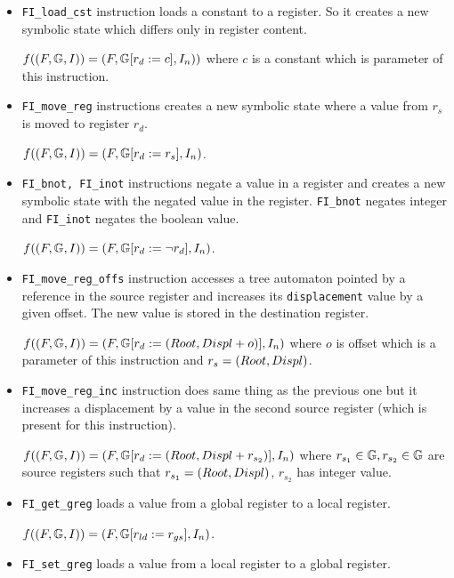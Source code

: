 \begin{itemize}

	\item {\tt FI\_load\_cst} instruction loads a constant to a register.
		So it creates a new symbolic state which differs only in register content.
		
		$f((F, \mathbb{G}, I)) = (F, \mathbb{G} [r_d := c], I_n))$ where
		$c$ is a constant which is parameter of this instruction.
	
	\item {\tt FI\_move\_reg} instructions creates a new symbolic state where
		a value from $r_s$ is moved to register $r_d$.
		
		$f((F, \mathbb{G}, I)) = (F, \mathbb{G} [r_d := r_s], I_n)$.
	
	\item {\tt FI\_bnot, FI\_inot} instructions negate a value in a register and
		creates a new symbolic state with the negated value in the register.
		{\tt FI\_bnot} negates integer and {\tt FI\_inot} negates the boolean value.
		
		$f((F, \mathbb{G}, I)) = (F, \mathbb{G} [r_d := \neg r_d], I_n)$.
	
	\item {\tt FI\_move\_reg\_offs} instruction accesses a tree automaton pointed
		by a reference in the source register and increases its {\tt displacement} value by a given offset.
		The new value is stored in the destination register.
		
		$f((F, \mathbb{G}, I)) = (F, \mathbb{G} [r_d := (Root,Displ+o)], I_n)$
		where $o$ is offset which is a parameter of this instruction
		and $r_s=(Root,Displ)$.
	
	\item {\tt FI\_move\_reg\_inc} instruction does same thing as the previous one but
		it increases a displacement by a value in the second source register (which is
		present for this instruction).
		
		$f((F, \mathbb{G}, I)) = (F, \mathbb{G} [r_d := (Root,Displ + r_{s_2})], I_n)$
		where $r_{s_1} \in \mathbb{G}, r_{s_2} \in \mathbb{G}$ are source registers such that
		$r_{s_1}=(Root,Displ)$, $r_{s_2}$ has integer value.
	
	\item {\tt FI\_get\_greg} loads a value from a global register to
		a local register.
		
		$f((F, \mathbb{G}, I)) = (F, \mathbb{G} [r_{ld} := r_{gs}], I_n)$.
	
	\item {\tt FI\_set\_greg} loads a value from a local register to
		a global register.
		

\end{itemize}
